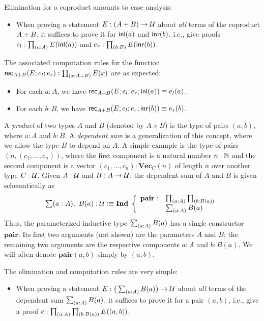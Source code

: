 Elimination for a coproduct amounts to case analysis:
\begin{itemize}
\item When proving a statement $E : (A + B) \to \mathcal{U}$ about \emph{all} terms of the coproduct $A + B$, it suffices to prove it for $\mathsf{inl}(a)$ and $\mathsf{inr}(b)$, i.e., give proofs $e_l : \prd{a:A} E(\inl(a))$ and $e_r : \prd{b:B} E(\inr(b))$.
\end{itemize}
The associated computation rules for the function $\rec{\disj{A}{B}}(E;e_l;e_r) : \prd{x:\disj{A}{B}} E(x)$ are as expected:
\begin{itemize}
\item For each $a : A$, we have $\mathsf{rec}_{A + B}(E;e_l;e_r;\mathsf{inl}(a)) \equiv e_l(a)$.
\item For each $b : B$, we have $\mathsf{rec}_{A + B}(E;e_l;e_r;\mathsf{inr}(b)) \equiv e_r(b)$.
\end{itemize}

A \emph{product} of two types $A$ and $B$ (denoted by $A \times B$) is the type of pairs $(a,b)$, where $a : A$ and $b : B$. A \emph{dependent sum} is a generalization of this concept, where we allow the type $B$ to depend on $A$. A simple example is the type of pairs $(n,(c_1,\ldots,c_n))$, where the first component is a natural number $n : \mathbb{N}$ and the second component is a vector $(c_1,\ldots,c_n) : \mathbf{Vec}_C(n)$ of length $n$ over another type $C : \mathcal{U}$.
Given $A : \mathcal{U}$ and $B : A \to \mathcal{U}$, the dependent sum of $A$ and $B$ is given schematically as
\[ \sm{a:A} B(a) : \type \defeq \myInd \left\{
\begin{array}{ll}
\mathbf{pair} : & \prd{a:A}{b:B(a)} \\
& \sm{a:A} B(a)
\end{array}
\right. \]
Thus, the parameterized inductive type $\sm{a:A} B(a)$ has a single constructor $\mathbf{pair}$. Its first two arguments (not shown) are the parameters $A$ and $B$; the remaining two arguments are the respective components $a : A$ and $b : B(a)$. We will often denote $\mathbf{pair}(a,b)$ simply by $(a,b)$.

The elimination and computation rules are very simple:

\begin{itemize}
\item When proving a statement $E : \big(\sm{a:A} B(a)\big) \to \type$ about \emph{all} terms of the dependent sum $\sm{a:A} B(a)$, it suffices to prove it for a pair $(a,b)$, i.e., give a proof $e : \prd{a:A}{b:B(a)} E((a,b))$.
\end{itemize}

